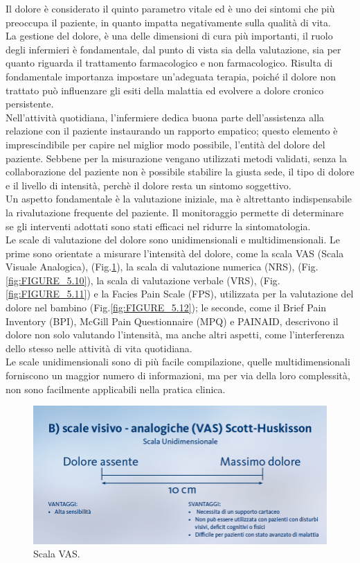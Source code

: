 Il dolore è considerato il quinto parametro vitale ed è uno dei sintomi che più preoccupa il paziente, 
in quanto impatta negativamente sulla qualità di vita.\\ La gestione del dolore, 
è una delle dimensioni di cura più importanti, il ruolo degli infermieri è fondamentale, 
dal punto di vista sia della valutazione, sia per quanto riguarda il trattamento farmacologico e non farmacologico. 
Risulta di fondamentale importanza impostare un’adeguata terapia, poiché il dolore non trattato può 
influenzare gli esiti della malattia ed evolvere a dolore cronico persistente.\\
Nell'attività quotidiana, l'infermiere dedica buona parte dell'assistenza alla relazione con il paziente instaurando
un rapporto empatico; questo elemento è imprescindibile per capire nel miglior modo possibile, l'entità del
dolore del paziente. Sebbe­ne per la misurazione vengano utilizzati metodi validati, senza la collabo­razione del 
paziente non è possibile stabilire la giusta sede, il tipo di dolo­re e il livello di intensità, 
perchè il dolore resta un sintomo soggettivo\cite{BOOK3}.\\
Un aspetto fondamentale è la valutazione iniziale, ma è altret­tanto indispensabile la rivalutazione frequente del paziente.
Il monitorag­gio permette di determinare se gli interventi adottati sono stati effi­caci nel ridurre la 
sintomatologia\cite{BOOK3}.\\ 
Le scale di valutazione del dolore sono unidimensionali e multidimensionali.
Le prime sono orientate a misurare l'intensità del dolore, come 
la scala VAS (Scala Visuale Analogica), (Fig.\ref{fig:FIGURE_5.9}), 
la scala di valutazione numerica (NRS), (Fig.\ref{fig:FIGURE_5.10}),
la scala di valutazione verbale (VRS), (Fig.\ref{fig:FIGURE_5.11}) e la Facies Pain Scale (FPS), utilizzata
per la valutazione del dolore nel bambino (Fig.\ref{fig:FIGURE_5.12});
le seconde, come il Brief Pain Inventory (BPI), McGill Pain Questionnaire (MPQ) 
e PAINAID, descrivono il dolore non solo valutando l'intensità, ma anche altri aspetti, 
come l'interferenza dello stesso nelle attività di vita quotidiana.\\ Le scale unidimensionali sono di più 
facile compilazione, quelle multidimensionali forniscono un maggior numero di informazioni, ma per via della loro 
complessità, non sono facilmente applicabili nella pratica clinica\cite{BOOK3}.

\begin{figure}[H]
    \begin{center}
    \includegraphics[width=0.6\columnwidth]{img/VAS.jpeg}
    \vspace{-3mm}
    \end{center}
    \caption{Scala VAS.
    \cite{SCALEDOLORE}}
    \label{fig:FIGURE_5.9}
\end{figure}

